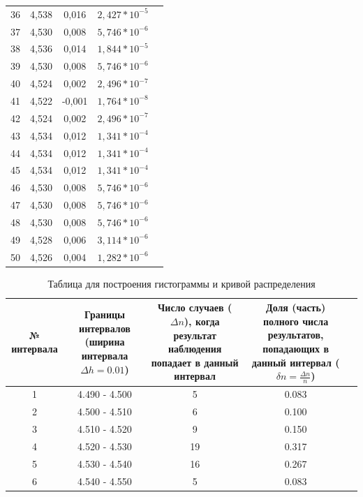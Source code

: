 \begin{center}
\begin{table}[h!]
\begin{tabular}{|c|c|c|c|c|}
36 & 4,538 & 0,016 & $2,427*10^{-5}$ \\
37 & 4,530 & 0,008 & $5,746*10^{-6}$ \\
38 & 4,536 & 0,014 & $1,844*10^{-5}$ \\
39 & 4,530 & 0,008 & $5,746*10^{-6}$ \\
40 & 4,524 & 0,002 & $2,496*10^{-7}$ \\
41 & 4,522 & -0,001 & $1,764*10^{-8}$ \\
42 & 4,524 & 0,002 & $2,496*10^{-7}$ \\
43 & 4,534 & 0,012 & $1,341*10^{-4}$ \\
44 & 4,534 & 0,012 & $1,341*10^{-4}$ \\
45 & 4,534 & 0,012 & $1,341*10^{-4}$ \\
46 & 4,530 & 0,008 & $5,746*10^{-6}$ \\
47 & 4,530 & 0,008 & $5,746*10^{-6}$ \\
48 & 4,530 & 0,008 & $5,746*10^{-6}$ \\
49 & 4,528 & 0,006 & $3,114*10^{-6}$ \\
50 & 4,526 & 0,004 & $1,282*10^{-6}$ \\
\hline
\end{tabular}
\end{table}
\end{center}

\begin{table}[h!]
\centering
\caption{Таблица для построения гистограммы и кривой распределения}
\label{tabl:1}
\begin{tabular}{|c|c|c|c|c|}
\hline
\begin{minipage}{7mm}
    № интервала 
\end{minipage}&
\begin{minipage}{5cm}
    Границы интервалов (ширина интервала $\Delta h = 0.01$)
\end{minipage} & 
\begin{minipage}{5cm}
    Число случаев ($\Delta n$), когда результат наблюдения попадает в данный интервал
\end{minipage} & 
\begin{minipage}{5cm}
    Доля (часть) полного числа результатов, попадающих в данный интервал ($\delta n = \frac{\Delta n}{n}$)
\end{minipage}\\
\hline
1 & 4.490 - 4.500 & 5 & 0.083 \\
2 & 4.500 - 4.510 & 6 & 0.100 \\
3 & 4.510 - 4.520 & 9 & 0.150 \\
4 & 4.520 - 4.530 & 19 & 0.317 \\
5 & 4.530 - 4.540 & 16 & 0.267 \\
6 & 4.540 - 4.550 & 5 & 0.083 \\
\hline
\end{tabular}
\end{table}

